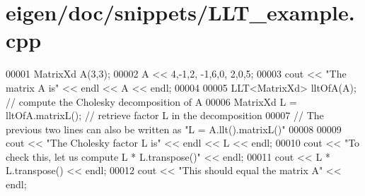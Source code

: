\hypertarget{eigen_2doc_2snippets_2_l_l_t__example_8cpp_source}{}\section{eigen/doc/snippets/\+L\+L\+T\+\_\+example.cpp}
\label{eigen_2doc_2snippets_2_l_l_t__example_8cpp_source}

\begin{DoxyCode}
00001 MatrixXd A(3,3);
00002 A << 4,-1,2, -1,6,0, 2,0,5;
00003 cout << \textcolor{stringliteral}{"The matrix A is"} << endl << A << endl;
00004 
00005 LLT<MatrixXd> lltOfA(A); \textcolor{comment}{// compute the Cholesky decomposition of A}
00006 MatrixXd L = lltOfA.matrixL(); \textcolor{comment}{// retrieve factor L  in the decomposition}
00007 \textcolor{comment}{// The previous two lines can also be written as "L = A.llt().matrixL()"}
00008 
00009 cout << \textcolor{stringliteral}{"The Cholesky factor L is"} << endl << L << endl;
00010 cout << \textcolor{stringliteral}{"To check this, let us compute L * L.transpose()"} << endl;
00011 cout << L * L.transpose() << endl;
00012 cout << \textcolor{stringliteral}{"This should equal the matrix A"} << endl;
\end{DoxyCode}
